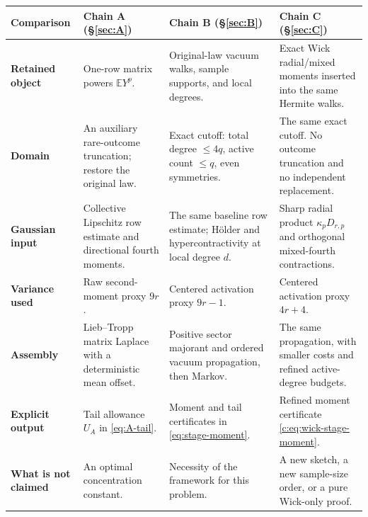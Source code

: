 \documentclass[11pt]{article}
\numberwithin{equation}{section}
\theoremstyle{definition}\newtheorem{definition}[theorem]{Definition}
\theoremstyle{remark}\newtheorem{remark}[theorem]{Remark}
\begin{document}
\begingroup\fontsize{9.4}{11.4}\selectfont
\setlength{\tabcolsep}{4pt}\renewcommand{\arraystretch}{1.13}
\begin{tabularx}{\textwidth}{@{}P{.14\textwidth}YYY@{}}
\toprule
\textbf{Comparison}&{\color{Teal}\textbf{Chain A} (\S\ref{sec:A})}&
{\color{Navy}\textbf{Chain B} (\S\ref{sec:B})}&
{\color{Amber}\textbf{Chain C} (\S\ref{sec:C})}\\
\midrule
{}
\textbf{Retained object}&One-row matrix powers $\mathbb E Y^p$.&
Original-law vacuum walks, sample supports, and local degrees.&
Exact Wick radial/mixed moments inserted into the same Hermite walks.\\[3pt]
\textbf{Domain}&An auxiliary rare-outcome truncation; restore the original law.&
Exact cutoff: total degree $\le4q$, active count $\le q$, even symmetries.&
The same exact cutoff. No outcome truncation and no independent replacement.\\[3pt]
\textbf{Gaussian input}&Collective Lipschitz row estimate and directional fourth moments.&
The same baseline row estimate; H\"older and hypercontractivity at local degree $d$.&
Sharp radial product $\kappa_pD_{r,p}$ and orthogonal mixed-fourth contractions.\\[3pt]
\textbf{Variance used}&Raw second-moment proxy $9r$.&
Centered activation proxy $9r-1$.&
Centered activation proxy $4r+4$.\\[3pt]
\textbf{Assembly}&Lieb--Tropp matrix Laplace with a deterministic mean offset.&
Positive sector majorant and ordered vacuum propagation, then Markov.&
The same propagation, with smaller costs and refined active-degree budgets.\\[3pt]
\textbf{Explicit output}&Tail allowance $U_A$ in \eqref{eq:A-tail}.&
Moment and tail certificates in \eqref{eq:stage-moment}.&
Refined moment certificate \eqref{c:eq:wick-stage-moment}.\\[3pt]
\textbf{What is not claimed}&An optimal concentration constant.&
Necessity of the framework for this problem.&
A new sketch, a new sample-size order, or a pure Wick-only proof.\\[3pt]
\bottomrule
\end{tabularx}
\endgroup
\end{document}
